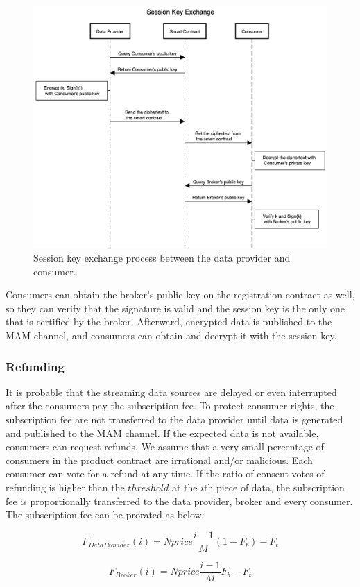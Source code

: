 \documentclass[journal,article,submit,moreauthors,pdftex]{Definitions/mdpi}
\begin{document}
\begin{figure}[H]
    \centering
    \includegraphics[width=3.3 in]{key_exchange}
    \caption{Session key exchange process between the data provider and consumer.}
    \label{fig:key_exchange}
\end{figure}

Consumers can obtain the broker's public key on the registration contract as well, so they can verify that the signature is valid and the session key is the only one that is certified by the broker. Afterward, encrypted data is published to the MAM channel, and consumers can obtain and decrypt it with the session key.

\subsubsection{Refunding}
It is probable that the streaming data sources are delayed or even interrupted after the consumers pay the subscription fee. To protect consumer rights, the subscription fee are not transferred to the data provider until data is generated and published to the MAM channel. If the expected data is not available, consumers can request refunds. We assume that a very small percentage of consumers in the product contract are irrational and/or malicious. Each consumer can vote for a refund at any time. If the ratio of consent votes of refunding is higher than the $threshold$ at the $i$th piece of data, the subscription fee is proportionally transferred to the data provider, broker and every consumer. The subscription fee can be prorated as below:

\begin{equation}
    F_{DataProvider}(i) = N price \frac{i-1}{M} (1-F_{b}) -F_{t}
\end{equation}

\begin{equation}
    F_{Broker}(i) = N price \frac{i-1}{M} F_{b} -F_{t}
\end{equation}
\end{document}
